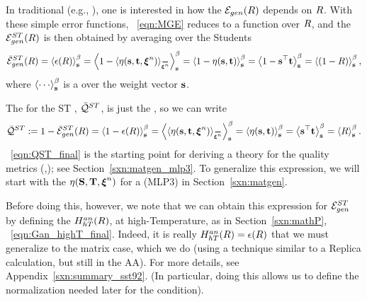 In traditional \STATMECH (e.g., \cite{SST92}), one is interested in how the \emph{\TotalModelGeneralizationError} ${\mathcal{E}}_{gen}(R)$ depends on $R$.
With these simple error functions, \EQN~\ref{eqn:MGE} reduces to a function over $R$,
and the \AverageSTGeneralizationError ${\mathcal{E}}^{ST}_{gen}(R)$ is then obtained by averaging over the Students 
\begin{align}
\label{eqn:AVGSTGE_R}
\AVGSTGE(\AVGR)=\THRMAVG{\EPSL(\AVGR)}=
\THRMAVG{1-\langle\ETA(\SVEC,\TVEC,\NDXI)\rangle_{\AVGNDXI}}=
\THRMAVG{1-\ETA(\SVEC,\TVEC)}=
\THRMAVG{1-\SVEC^{\top}\TVEC}=
\THRMAVG{(1-\AVGR)}  ,
\end{align}
where $\THRMAVG{\cdots}$ is a \ThermalAverage over the \Student weight vector ${\mathbf{s}}$.

The \ModelQuality for the ST \Perceptron, $\bar{\mathcal{Q}}^{ST}$,
is just the \AverageGeneralizationAccuracy, so we can write
\begin{align}
\label{eqn:QST_final}
\Q^{ST} := 1 - \AVGSTGE(\AVGR) 
       = \THRMAVG{1 - \EPSL(\AVGR)} 
       = \THRMAVG{\langle\ETA(\SVEC, \TVEC, \NDXI)\rangle_{\AVGNDXI}} 
       = \THRMAVG{\ETA(\SVEC, \TVEC)} 
       = \THRMAVG{\SVEC^{\top}\TVEC} 
       = \THRMAVG{\AVGR}.
\end{align}
\EQN~\ref{eqn:QST_final} is the starting point for deriving a \SEMIEMP theory for the \WW quality metrics (\ALPHA,\ALPHAHAT);
see Section~\ref{sxn:matgen_mlp3}.
To generalize this expression, we will start with the \SelfOverlap $\eta({\mathbf{S}},{\mathbf{T}},\boldsymbol{\xi}^{n})$ for a
\MultiLayerPerceptron (MLP3) in Section~\ref{sxn:matgen}.

Before doing this, however, we note that we can obtain this expression for ${\mathcal{E}}^{ST}_{gen}$ by defining the
\AnnealedHamiltonian $H^{an}_{hT}(R)$, at high-Temperature, as in Section~\ref{sxn:mathP}, \EQN~\ref{eqn:Gan_highT_final}.
Indeed, it is really $H^{an}_{hT}(R)=\epsilon(R)$ that we must generalize to the matrix case, which we do (using a technique
similar to a Replica calculation, but still in the AA).
For more details, see Appendix~\ref{sxn:summary_sst92}.
(In particular, doing this allows us to define the normalization needed later for the \TRACELOG condition).


